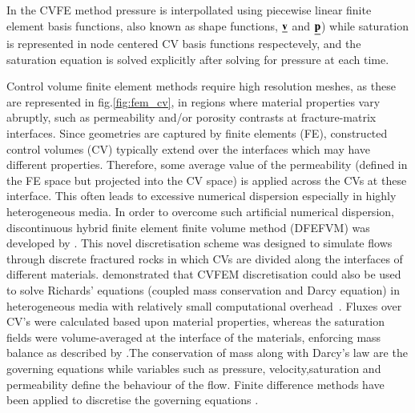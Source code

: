\documentclass[preprint,authoryear,12pt]{elsarticle}
\begin{document}
\medskip
In the CVFE method pressure is interpollated using piecewise linear finite element basis functions, also known as shape functions, $\underline{\bf v}$ and $\underline{\bf p}$) while saturation is represented in node centered CV basis functions respectevely, and the saturation equation is solved explicitly after solving for pressure at each time.

Control volume finite element methods require high resolution meshes, as these are represented in fig.\ref{fig:fem_cv}, in regions where material properties vary abruptly, such as permeability and/or porosity contrasts at fracture-matrix interfaces. Since geometries are captured by finite elements (FE), constructed control volumes (CV) typically extend over the interfaces which may have different properties. Therefore, some average value of the permeability (defined in the FE space but projected into the CV space) is applied across the CVs at these interface. This often leads to excessive numerical dispersion especially in highly heterogeneous media. In order to overcome such artificial numerical dispersion, discontinuous hybrid finite element finite volume method (DFEFVM) was developed by \citet{nick_2011b, nick_2011a}. This novel discretisation scheme was designed to simulate flows through discrete fractured rocks in which CVs are divided along the interfaces of different materials. \citet{cumming_2011} demonstrated that CVFEM discretisation could also be used to solve Richards' equations (coupled mass conservation and Darcy equation) in heterogeneous media with relatively small computational overhead~\citep[compared with traditional coupled velocity-pressure based formulations, see also][]{cumming_phd2012}. Fluxes over CV's were calculated based upon material properties, whereas the saturation fields were volume-averaged at the interface of the materials, enforcing mass balance as described by \citet{kirkland_1992}.The conservation of mass along with Darcy's law are the governing equations while variables such as pressure, velocity,saturation and permeability define the behaviour of the flow. Finite difference methods have been applied to discretise the governing equations \citep{Luo2016,Moortgat2016,Hoteit2008} .
\end{document}
